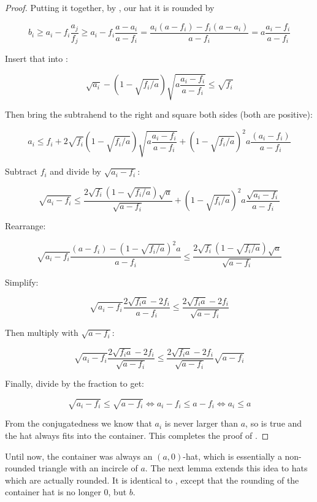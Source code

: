 \documentclass[a4paper,style=print,bibliography=totoc,nexus,lnum,extramargin]{tubsbook}
\begin{document}
\begin{proof}

    Putting it together, by , our hat it is rounded by

    $$b_i \ge a_i - f_i\frac{a_j}{f_j} \ge a_i - f_i\frac{a-a_i}{a-f_i} = \frac{a_i(a-f_i)-f_i(a-a_i)}{a-f_i} = a\frac{a_i-f_i}{a-f_i}$$

    Insert that into :

    $$\sqrt{a_i} - (1-\sqrt{f_i/a})\sqrt{a\frac{a_i-f_i}{a-f_i}} \le \sqrt{f_i}$$

    Then bring the subtrahend to the right and square both sides (both are positive):

    $$a_i \le f_i + 2\sqrt{f_i}(1-\sqrt{f_i/a})\sqrt{a\frac{a_i-f_i}{a-f_i}} + (1-\sqrt{f_i/a})^2a\frac{(a_i-f_i)}{a-f_i}$$

    Subtract $f_i$ and divide by $\sqrt{a_i-f_i}$:

    $$\sqrt{a_i-f_i} \le \frac{2\sqrt{f_i}(1-\sqrt{f_i/a})\sqrt{a}}{\sqrt{a-f_i}} + (1-\sqrt{f_i/a})^2a\frac{\sqrt{a_i-f_i}}{a-f_i}$$

    Rearrange:

    $$\sqrt{a_i-f_i}\frac{(a-f_i)-(1-\sqrt{f_i/a})^2a}{a-f_i} \le \frac{2\sqrt{f_i}(1-\sqrt{f_i/a})\sqrt{a}}{\sqrt{a-f_i}}$$

    Simplify:

    $$\sqrt{a_i-f_i}\frac{2\sqrt{f_ia}-2f_i}{a-f_i} \le \frac{2\sqrt{f_ia}-2f_i}{\sqrt{a-f_i}}$$

    Then multiply with $\sqrt{a-f_i}$:

    $$\sqrt{a_i-f_i}\frac{2\sqrt{f_ia}-2f_i}{\sqrt{a-f_i}} \le \frac{2\sqrt{f_ia}-2f_i}{\sqrt{a-f_i}}\sqrt{a-f_i}$$

    Finally, divide by the fraction to get:

    \begin{equation*}
        \sqrt{a_i-f_i} \le \sqrt{a-f_i} \iff a_i - f_i \le a - f_i \iff a_i \le a
    \end{equation*}

    From the conjugatedness we know that $a_i$ is never larger than $a$, so  is true and the hat always fits into the container. This completes the proof of .
\end{proof}

Until now, the container was always an $(a,0)$-hat, which is essentially a non-rounded triangle with an incircle of $a$. The next lemma extends this idea to hats which are actually rounded. It is identical to , except that the rounding of the container hat is no longer 0, but $b$.
\end{document}
